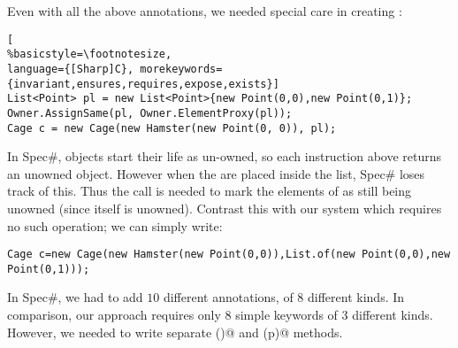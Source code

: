 
Even with all the above annotations, we needed special care in creating \Q@Cage@s:%
\begin{lstlisting}[
%basicstyle=\footnotesize,
language={[Sharp]C}, morekeywords={invariant,ensures,requires,expose,exists}]
List<Point> pl = new List<Point>{new Point(0,0),new Point(0,1)};
Owner.AssignSame(pl, Owner.ElementProxy(pl));
Cage c = new Cage(new Hamster(new Point(0, 0)), pl);
\end{lstlisting}

\noindent In Spec\#, objects start their life as un-owned, so each \Q@new@ instruction above returns an unowned object. However when the \Q@Point@s are placed inside the \Q@pl@ list, Spec\# loses track of this. Thus the \Q@AssignSame@ call is needed to mark the elements of \Q@pl@ as still being unowned (since \Q@pl@ itself is unowned).
Contrast this with our system which requires no such operation; we can simply write:
\begin{lstlisting}
Cage c=new Cage(new Hamster(new Point(0,0)),List.of(new Point(0,0),new Point(0,1)));
\end{lstlisting}

In Spec\#, we had to add $10$ different annotations, of $8$ different kinds.
In comparison, our approach requires only $8$ simple keywords of $3$ different kinds. However, we needed to write 
separate \Q@pos()@ and \Q@moveTo(p)@ methods.

